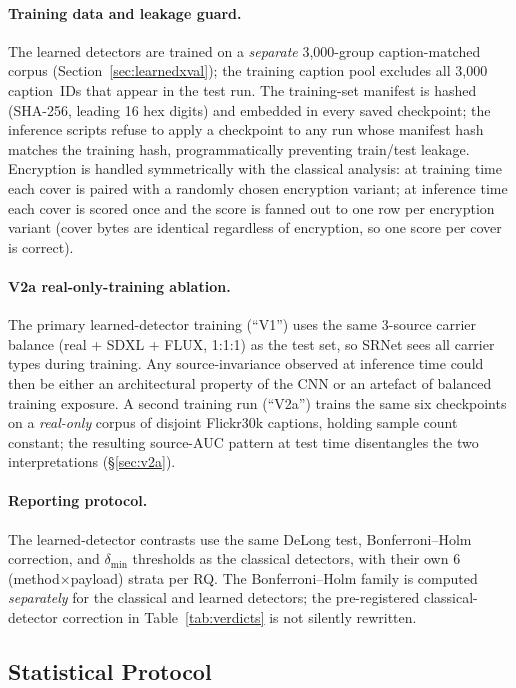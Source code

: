 \documentclass[10pt,twocolumn,a4paper]{article}
\begin{document}
\paragraph{Training data and leakage guard.} The learned detectors are trained on a \emph{separate} 3{,}000-group caption-matched corpus (Section~\ref{sec:learnedxval}); the training caption pool excludes all 3{,}000 caption~IDs that appear in the test run. The training-set manifest is hashed (SHA-256, leading 16 hex digits) and embedded in every saved checkpoint; the inference scripts refuse to apply a checkpoint to any run whose manifest hash matches the training hash, programmatically preventing train/test leakage. Encryption is handled symmetrically with the classical analysis: at training time each cover is paired with a randomly chosen encryption variant; at inference time each cover is scored once and the score is fanned out to one row per encryption variant (cover bytes are identical regardless of encryption, so one score per cover is correct).

\paragraph{V2a real-only-training ablation.} The primary learned-detector training (``V1'') uses the same 3-source carrier balance (real + SDXL + FLUX, 1:1:1) as the test set, so SRNet sees all carrier types during training. Any source-invariance observed at inference time could then be either an architectural property of the CNN or an artefact of balanced training exposure. A second training run (``V2a'') trains the same six checkpoints on a \emph{real-only} corpus of disjoint Flickr30k captions, holding sample count constant; the resulting source-AUC pattern at test time disentangles the two interpretations (\S\ref{sec:v2a}).

\paragraph{Reporting protocol.} The learned-detector contrasts use the same DeLong test, Bonferroni--Holm correction, and $\delta_\text{min}$ thresholds as the classical detectors, with their own 6 (method$\times$payload) strata per RQ. The Bonferroni--Holm family is computed \emph{separately} for the classical and learned detectors; the pre-registered classical-detector correction in Table~\ref{tab:verdicts} is not silently rewritten.

\subsection{Statistical Protocol}
\label{sec:stats}
\end{document}
